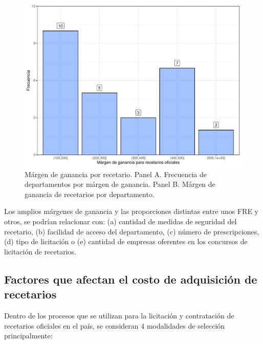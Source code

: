 \documentclass[
]{book}
\begin{document}
\begin{figure}

{\centering \includegraphics[width=1\linewidth]{InformeFinal_files/figure-latex/comparativoDepartamentos0-1} 

}

\caption{Márgen de ganancia por recetario. Panel A. Frecuencia de departamentos por márgen de ganancia. Panel B. Márgen de ganancia de recetarios por departamento.}\label{fig:comparativoDepartamentos0}
\end{figure}

Los amplios márgenes de ganancia y las proporciones distintas entre unos FRE y otros, se podrían relacionar con: (a) cantidad de medidas de seguridad del recetario, (b) facilidad de acceso del departamento, (c) número de prescripciones, (d) tipo de licitación o (e) cantidad de empresas oferentes en los concursos de licitación de recetarios.

\hypertarget{factores-que-afectan-el-costo-de-adquisiciuxf3n-de-recetarios}{%
\subsection{Factores que afectan el costo de adquisición de recetarios}\label{factores-que-afectan-el-costo-de-adquisiciuxf3n-de-recetarios}}

Dentro de los procesos que se utilizan para la licitación y contratación de recetarios oficiales en el país, se consideran 4 modalidades de selección principalmente:
\end{document}
